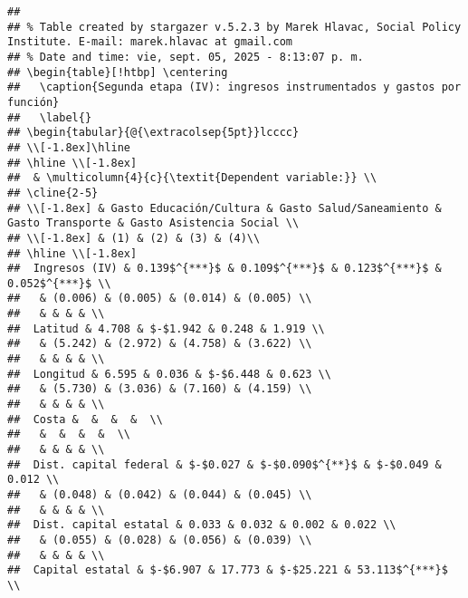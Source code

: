 \documentclass[
]{article}
\begin{document}
\begin{verbatim}
## 
## % Table created by stargazer v.5.2.3 by Marek Hlavac, Social Policy Institute. E-mail: marek.hlavac at gmail.com
## % Date and time: vie, sept. 05, 2025 - 8:13:07 p. m.
## \begin{table}[!htbp] \centering 
##   \caption{Segunda etapa (IV): ingresos instrumentados y gastos por función} 
##   \label{} 
## \begin{tabular}{@{\extracolsep{5pt}}lcccc} 
## \\[-1.8ex]\hline 
## \hline \\[-1.8ex] 
##  & \multicolumn{4}{c}{\textit{Dependent variable:}} \\ 
## \cline{2-5} 
## \\[-1.8ex] & Gasto Educación/Cultura & Gasto Salud/Saneamiento & Gasto Transporte & Gasto Asistencia Social \\ 
## \\[-1.8ex] & (1) & (2) & (3) & (4)\\ 
## \hline \\[-1.8ex] 
##  Ingresos (IV) & 0.139$^{***}$ & 0.109$^{***}$ & 0.123$^{***}$ & 0.052$^{***}$ \\ 
##   & (0.006) & (0.005) & (0.014) & (0.005) \\ 
##   & & & & \\ 
##  Latitud & 4.708 & $-$1.942 & 0.248 & 1.919 \\ 
##   & (5.242) & (2.972) & (4.758) & (3.622) \\ 
##   & & & & \\ 
##  Longitud & 6.595 & 0.036 & $-$6.448 & 0.623 \\ 
##   & (5.730) & (3.036) & (7.160) & (4.159) \\ 
##   & & & & \\ 
##  Costa &  &  &  &  \\ 
##   &  &  &  &  \\ 
##   & & & & \\ 
##  Dist. capital federal & $-$0.027 & $-$0.090$^{**}$ & $-$0.049 & 0.012 \\ 
##   & (0.048) & (0.042) & (0.044) & (0.045) \\ 
##   & & & & \\ 
##  Dist. capital estatal & 0.033 & 0.032 & 0.002 & 0.022 \\ 
##   & (0.055) & (0.028) & (0.056) & (0.039) \\ 
##   & & & & \\ 
##  Capital estatal & $-$6.907 & 17.773 & $-$25.221 & 53.113$^{***}$ \\ 

\end{verbatim}
\end{document}
